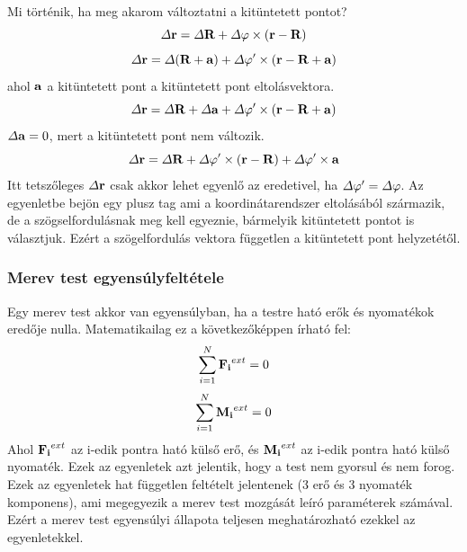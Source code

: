 \documentclass[a4paper,12pt]{article}
\begin{document}
Mi történik, ha meg akarom változtatni a kitüntetett pontot?
\begin{equation}
    \varDelta \bold{r} = \varDelta \bold{R} + \varDelta \bold{\varphi} \times (\bold{r} - \bold{R})
\end{equation}
\begin{equation}
    \varDelta \bold{r} = \varDelta (\bold{R} + \bold{a}) + \varDelta \bold{\varphi'} \times (\bold{r} - \bold{R} + \bold{a})
\end{equation}
ahol $\bold{a}$ a kitüntetett pont a kitüntetett pont eltolásvektora.
\begin{equation}
    \varDelta \bold{r} = \varDelta \bold{R} + \varDelta \bold{a} + \varDelta \bold{\varphi'} \times (\bold{r} - \bold{R} + \bold{a})
\end{equation}
$\varDelta \bold{a} = 0$, mert a kitüntetett pont nem változik.
\begin{equation}
    \varDelta \bold{r} = \varDelta \bold{R} + \varDelta \bold{\varphi'} \times (\bold{r} - \bold{R}) + \varDelta \bold{\varphi'} \times \bold{a}
\end{equation}
Itt tetszőleges $\varDelta \bold{r}$ csak akkor lehet egyenlő az eredetivel, ha $\varDelta \bold{\varphi'} = \varDelta \bold{\varphi}$. Az egyenletbe bejön egy plusz tag ami a koordinátarendszer eltolásából származik,
de a szögselfordulásnak meg kell egyeznie, bármelyik kitüntetett pontot is választjuk. Ezért a szögelfordulás vektora független a kitüntetett pont helyzetétől.

\subsubsection{Merev test egyensúlyfeltétele}
Egy merev test akkor van egyensúlyban, ha a testre ható erők és nyomatékok eredője nulla. Matematikailag ez a következőképpen írható fel:
\begin{equation}
    \sum_{i=1}^{N} \bold{F_i}^{ext} = 0
\end{equation}
\begin{equation}
    \sum_{i=1}^{N} \bold{M_i}^{ext} = 0
\end{equation}
Ahol $\bold{F_i}^{ext}$ az i-edik pontra ható külső erő, és $\bold{M_i}^{ext}$ az i-edik pontra ható külső nyomaték. Ezek az egyenletek azt jelentik, hogy a test nem gyorsul és nem forog.
Ezek az egyenletek hat független feltételt jelentenek (3 erő és 3 nyomaték komponens), ami megegyezik a merev test mozgását leíró paraméterek számával. Ezért a merev test egyensúlyi állapota teljesen meghatározható ezekkel az egyenletekkel.
\end{document}
